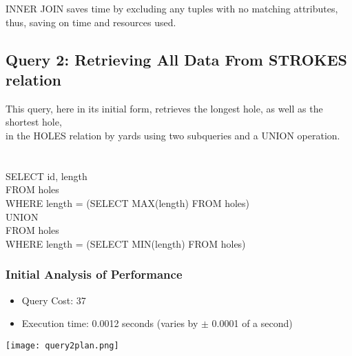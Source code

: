 \documentclass[titlepage]{article}
\begin{document}
\noindent
INNER JOIN saves time by excluding any tuples with no matching attributes, thus, saving on time and resources used.
\vspace{1em}
\subsection{Query 2: Retrieving All Data From STROKES relation}
\vspace{1em}
This query, here in its initial form, retrieves the longest hole, as well as the shortest hole, \\
in the HOLES relation by yards using two subqueries and a UNION operation.\\ \\ \\
\hspace{15pt}SELECT id, length \\
\hspace{15pt}FROM holes \\
\hspace{15pt}WHERE length = (SELECT MAX(length) FROM holes) \\
\hspace{15pt}UNION \\
\hspace{15pt}FROM holes \\
\hspace{15pt}WHERE length = (SELECT MIN(length) FROM holes) \\
\vspace{1em}
\newpage
\subsubsection{Initial Analysis of Performance}
\vspace{1em}
\begin{itemize}
  \item Query Cost: 37
  \item Execution time: 0.0012 seconds (varies by $\pm$ 0.0001 of a second)
\end{itemize}
\vspace{1em}
\vspace{1em}
\begin{center}
  \texttt{[image: query2plan.png]}
\end{center}
\vspace{1em}
\end{document}
